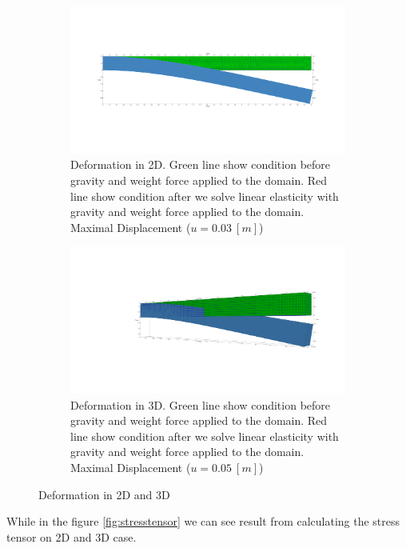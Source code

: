 \documentclass[a4paper,11pt]{article}
\begin{document}
\begin{figure}[h!]
	\begin{subfigure}[b]{0.5\linewidth}
		\centering
		\includegraphics[width=\linewidth]{picture/conference/2d1}
		\caption{Deformation in 2D. Green line show condition before gravity and weight force applied to the domain. Red line show condition after we solve linear elasticity with gravity and weight force applied to the domain. Maximal Displacement ($u = 0.03\ [m]$)}
		\label{fig:2dresult}
	\end{subfigure}
\quad
	\begin{subfigure}[b]{0.5\linewidth}
		\centering
		\includegraphics[width=\linewidth]{picture/conference/3d1}
		\caption{Deformation in 3D. Green line show condition before gravity and weight force applied to the domain. Red line show condition after we solve linear elasticity with gravity and weight force applied to the domain. Maximal Displacement ($u = 0.05\ [m]$)}
		\label{fig:3dresult}
	\end{subfigure}
\caption{Deformation in 2D and 3D}
\label{fig:displacementresult}
\end{figure}
\newline
While in the figure \ref{fig:stresstensor} we can see result from calculating the stress tensor on 2D and 3D case.
\end{document}
